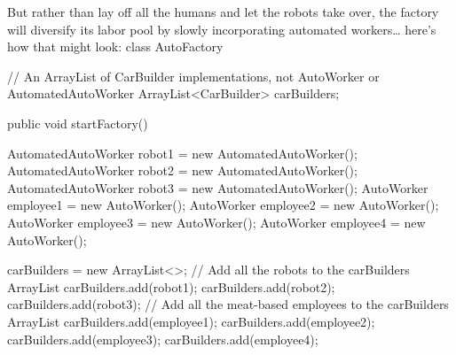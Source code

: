         But rather than lay off all the humans and let the robots take over, the factory will diversify its labor pool by slowly incorporating automated workers… here’s how that might look:
            class AutoFactory {
                // An ArrayList of CarBuilder implementations, not AutoWorker or AutomatedAutoWorker
                ArrayList<CarBuilder> carBuilders;
            
                public void startFactory() {
                    AutomatedAutoWorker robot1 = new AutomatedAutoWorker();
                    AutomatedAutoWorker robot2 = new AutomatedAutoWorker();
                    AutomatedAutoWorker robot3 = new AutomatedAutoWorker();
                    AutoWorker employee1 = new AutoWorker();
                    AutoWorker employee2 = new AutoWorker();
                    AutoWorker employee3 = new AutoWorker();
                    AutoWorker employee4 = new AutoWorker();
            
                    carBuilders = new ArrayList<>;
                    // Add all the robots to the carBuilders ArrayList
                    carBuilders.add(robot1);
                    carBuilders.add(robot2);
                    carBuilders.add(robot3);
                    // Add all the  meat-based employees to the carBuilders ArrayList
                    carBuilders.add(employee1);
                    carBuilders.add(employee2);
                    carBuilders.add(employee3);
                    carBuilders.add(employee4);       
                }
            }

